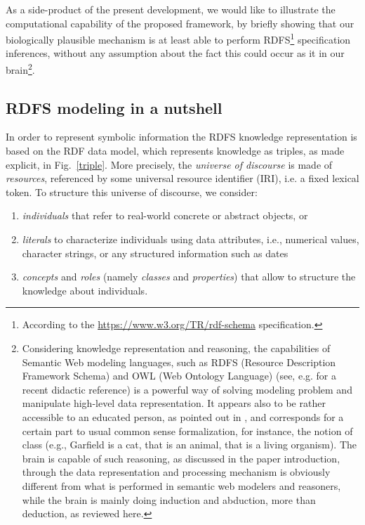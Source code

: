 \documentclass[sn-mathphys]{sn-jnl}
\begin{document}
\begin{appendices}
As a side-product of the present development, we would like to illustrate the computational capability of the proposed framework, by briefly showing that our biologically plausible mechanism is at least able to perform RDFS\footnote{According to the \url{https://www.w3.org/TR/rdf-schema} specification.} specification inferences, without any assumption about the fact this could occur as it in our brain\footnote{Considering knowledge representation and reasoning, the capabilities of Semantic Web modeling languages, such as RDFS (Resource Description Framework Schema) and OWL (Web Ontology Language) (see, e.g. \cite{allemang_semantic_2020} for a recent didactic reference) is a powerful way of solving modeling problem and manipulate high-level data representation. It appears also to be rather accessible to an educated person, as pointed out in \cite{allemang_semantic_2020}, and corresponds for a certain part to usual common sense formalization, for instance, the notion of class (e.g., Garfield is a cat, that is an animal, that is a living organism). The brain is capable of such reasoning, as discussed in the paper introduction, through the data representation and processing mechanism is obviously different from what is performed in semantic web modelers and reasoners, while the brain is mainly doing induction and abduction, more than deduction, as reviewed here.}.

\subsection*{RDFS modeling in a nutshell}

In order to represent symbolic information the RDFS knowledge representation is based on the RDF data model, which represents knowledge  as triples, as made explicit, in Fig.~\ref{triple}. More precisely, the \emph{universe of discourse} is made of \emph{resources}, referenced by some universal resource identifier (IRI), i.e. a fixed lexical token. To structure this universe of discourse, we consider: \begin{enumerate}[label=(\roman*)]
    \item \emph{individuals} that refer to real-world concrete or abstract objects, or 
    \item \emph{literals} to characterize individuals using data attributes, i.e., numerical values, character strings, or any structured information such as dates
    \item \emph{concepts} and \emph{roles} (namely \emph{classes} and \emph{properties}) that allow to structure the knowledge about individuals.
\end{enumerate}


\end{appendices}
\end{document}
